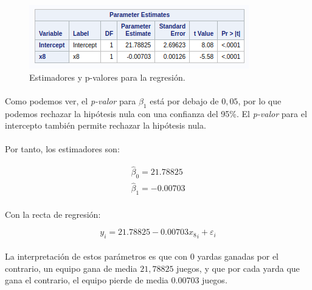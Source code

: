 \documentclass{article}
\begin{document}
  \begin{figure}[H]
    \centering
    \includegraphics[width=.5\textwidth]{img/montgomery/procreg.png}
    \caption{Estimadores y p-valores para la regresión.}
    \label{img:mont-procreg}
  \end{figure}

  \paragraph{}
  Como podemos ver, el \textit{p-valor} para $\beta_1$ está por debajo de $0,05$, por lo que podemos rechazar la hipótesis nula con una confianza del 95\%. El \textit{p-valor} para el intercepto también permite rechazar la hipótesis nula.

  \paragraph{}
  Por tanto, los estimadores son:

  \begin{align}
    \hat\beta_0 = 21.78825\\
    \hat\beta_1 = -0.00703
  \end{align}

  \paragraph{}
  Con la recta de regresión:

  \begin{equation}
    y_i = 21.78825 -0.00703{x_8}_i + \varepsilon_i
  \end{equation}

  \paragraph{}
  La interpretación de estos parámetros es que con 0 yardas ganadas por el contrario, un equipo gana de media $21,78825$ juegos, y que por cada yarda que gana el contrario, el equipo pierde de media $0.00703$ juegos.
\end{document}
